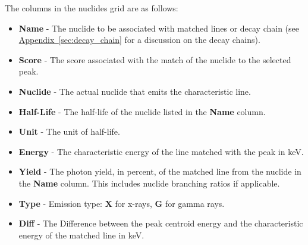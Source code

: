 \documentclass[12pt,report,justified]{SANDreport}
\begin{document}
The columns in the nuclides grid are as follows:
\begin{itemize}
    \item \textbf{Name} - The nuclide to be associated with matched lines or decay chain (see \hyperref[sec:decay_chain]{Appendix~\ref{sec:decay_chain}} for a discussion on the decay chains).
    \item \textbf{Score} - The score associated with the match of the nuclide to the selected peak.
    \item \textbf{Nuclide} - The actual nuclide that emits the characteristic line.
    \item \textbf{Half-Life} - The half-life of the nuclide listed in the \textbf{Name} column.
    \item \textbf{Unit} - The unit of half-life.
    \item \textbf{Energy} - The characteristic energy of the line matched with the peak in keV.
    \item \textbf{Yield} - The photon yield, in percent, of the matched line from the nuclide in the \textbf{Name} column. This includes nuclide branching ratios if applicable.
    \item \textbf{Type} - Emission type: \textbf{X} for x-rays, \textbf{G} for gamma rays.
    \item \textbf{Diff} - The Difference between the peak centroid energy and the characteristic energy of the matched line in keV.
\end{itemize}
\end{document}
